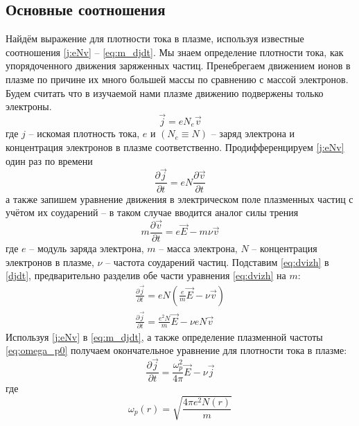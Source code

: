 \documentclass[a4paper]{article}
\begin{document}
\subsection{Основные соотношения}

Найдём выражение для плотности тока в плазме, используя известные соотношения \eqref{j:eNv} -- \eqref{eq:m_djdt}. Мы знаем определение плотности тока, как упорядоченного движения заряженных частиц. Пренебрегаем движением ионов в плазме по причине их много большей массы по сравнению с массой электронов. Будем считать что в изучаемой нами плазме движению подвержены только электроны.
\begin{equation}\label{j:eNv}
	\vec{j}=eN_{e}\vec{v}
\end{equation}
где $j$ -- искомая плотность тока, $e$ и $(N_{e}\equiv N)$ -- заряд электрона и концентрация электронов в плазме соответственно.
Продифференцируем \eqref{j:eNv}
один раз по времени
\begin{equation}\label{djdt}
	\frac{\partial \vec{j}}{\partial t}=eN\frac{\partial \vec{v}}{\partial t}
\end{equation}
а также запишем уравнение движения в электрическом поле плазменных частиц с учётом их соударений -- в таком случае вводится аналог силы трения
\begin{equation}\label{eq:dvizh}
	m\frac{\partial \vec{v}}{\partial t}=e\vec{E}-m\nu\vec{v}
\end{equation}
где $e$ -- модуль заряда электрона, $m$ -- масса электрона, $N$ -- концентрация электронов в плазме, $\nu$ -- частота соударений частиц.
Подставим \eqref{eq:dvizh} в \eqref{djdt}, предварительно разделив обе части уравнения \eqref{eq:dvizh} на $m$:
\begin{align}
	\frac{\partial\vec{j}}{\partial t}=eN\left(\frac{e}{m}\vec{E}-\nu\vec{v}\right)\\
	\frac{\partial\vec{j}}{\partial t}=\frac{e^{2}N}{m}\vec{E}-\nu eN\vec{v}\label{eq:m_djdt}
\end{align}
Используя \eqref{j:eNv} в \eqref{eq:m_djdt}, а также определение плазменной частоты \eqref{eq:omega_p0}
получаем окончательное уравнение для плотности тока в плазме:
\begin{equation}
	\frac{\partial\vec{j}}{\partial t}=\frac{\omega_{p}^{2}}{4\pi}\vec{E}-\nu\vec{j}
\end{equation}
где \begin{equation}\label{eq:omega_p0}
	\omega_{p}(r)=\sqrt{\frac{4\pi e^{2}N(r)}{m}}
\end{equation}
\end{document}
